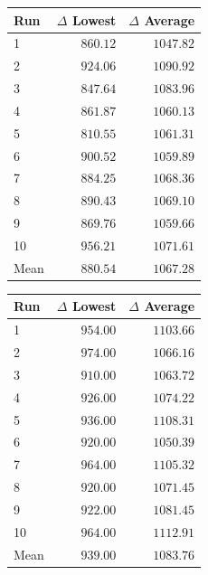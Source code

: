 \begin{table}[H]
    \centering
    \begin{minipage}[t]{0.48\textwidth}
        \centering
        \label{tab:gain-normal-erdos-renyi}
        \small
        \setlength{\tabcolsep}{4pt}
        \begin{tabular}{lrr}
            \toprule
            \textbf{Run} & \textbf{$\Delta$ Lowest} & \textbf{$\Delta$ Average} \\
            \midrule
            1 & $860.12$ & $1047.82$ \\
            2 & $924.06$ & $1090.92$ \\
            3 & $847.64$ & $1083.96$ \\
            4 & $861.87$ & $1060.13$ \\
            5 & $810.55$ & $1061.31$ \\
            6 & $900.52$ & $1059.89$ \\
            7 & $884.25$ & $1068.36$ \\
            8 & $890.43$ & $1069.10$ \\
            9 & $869.76$ & $1059.66$ \\
            10 & $956.21$ & $1071.61$ \\
            \midrule
            Mean & $880.54$ & $1067.28$ \\
            \bottomrule
        \end{tabular}
    \end{minipage}
    \hfill
    \begin{minipage}[t]{0.48\textwidth}
        \centering
        \label{tab:gain-binary-erdos-renyi}
        \small
        \setlength{\tabcolsep}{4pt}
        \begin{tabular}{lrr}
            \toprule
            \textbf{Run} & \textbf{$\Delta$ Lowest} & \textbf{$\Delta$ Average} \\
            \midrule
            1 & $954.00$ & $1103.66$ \\
            2 & $974.00$ & $1066.16$ \\
            3 & $910.00$ & $1063.72$ \\
            4 & $926.00$ & $1074.22$ \\
            5 & $936.00$ & $1108.31$ \\
            6 & $920.00$ & $1050.39$ \\
            7 & $964.00$ & $1105.32$ \\
            8 & $920.00$ & $1071.45$ \\
            9 & $922.00$ & $1081.45$ \\
            10 & $964.00$ & $1112.91$ \\
            \midrule
            Mean & $939.00$ & $1083.76$ \\
            \bottomrule
        \end{tabular}
    \end{minipage}
\end{table}

